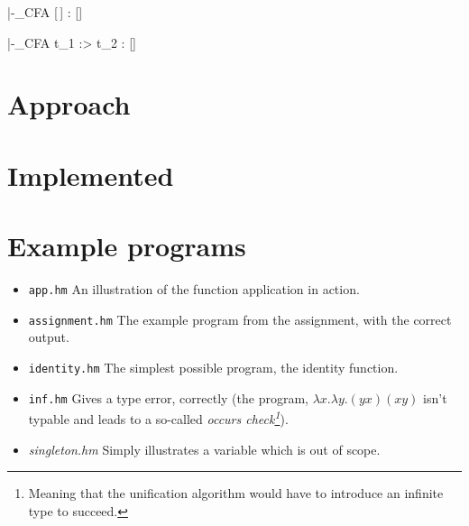 \documentclass[a4paper]{article}
\begin{document}
{\widehat{\Gamma} |-_{CFA} [\,] : [\widehat{\sigma}]}

{\widehat{\Gamma} |-_{CFA} t_1 \<:> t_2 :  [\widehat{\sigma}]}

\section{Approach}


\section{Implemented}

\section{Example programs}

\begin{itemize}
    \item \texttt{app.hm} An illustration of the function application in action. 
    \item \texttt{assignment.hm} The example program from the assignment, with
        the correct output. 
    \item \texttt{identity.hm} The simplest possible program, the identity
        function. 
    \item \texttt{inf.hm} Gives a type error, correctly (the program, $\lambda
        x.
        \lambda y . (y x) (x y)$ isn't typable and leads to a so-called
        \emph{occurs check\footnote{Meaning that the unification algorithm would
        have to introduce an infinite type to succeed.}}).
    \item \textit{singleton.hm} Simply illustrates a variable which is out of
        scope. 
\end{itemize}
\end{document}
